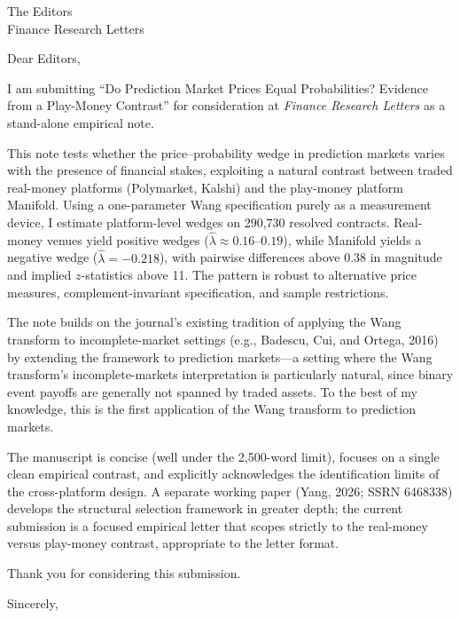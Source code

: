 \documentclass[11pt]{letter}
\begin{document}
\begin{letter}{The Editors\\Finance Research Letters}

\opening{Dear Editors,}

I am submitting ``Do Prediction Market Prices Equal Probabilities? Evidence from a Play-Money Contrast'' for consideration at \textit{Finance Research Letters} as a stand-alone empirical note.

This note tests whether the price--probability wedge in prediction markets varies with the presence of financial stakes, exploiting a natural contrast between traded real-money platforms (Polymarket, Kalshi) and the play-money platform Manifold. Using a one-parameter Wang specification purely as a measurement device, I estimate platform-level wedges on 290{,}730 resolved contracts. Real-money venues yield positive wedges ($\hat\lambda \approx 0.16$--$0.19$), while Manifold yields a negative wedge ($\hat\lambda = -0.218$), with pairwise differences above 0.38 in magnitude and implied $z$-statistics above 11. The pattern is robust to alternative price measures, complement-invariant specification, and sample restrictions.

The note builds on the journal's existing tradition of applying the Wang transform to incomplete-market settings (e.g., Badescu, Cui, and Ortega, 2016) by extending the framework to prediction markets---a setting where the Wang transform's incomplete-markets interpretation is particularly natural, since binary event payoffs are generally not spanned by traded assets. To the best of my knowledge, this is the first application of the Wang transform to prediction markets.

The manuscript is concise (well under the 2{,}500-word limit), focuses on a single clean empirical contrast, and explicitly acknowledges the identification limits of the cross-platform design. A separate working paper (Yang, 2026; SSRN 6468338) develops the structural selection framework in greater depth; the current submission is a focused empirical letter that scopes strictly to the real-money versus play-money contrast, appropriate to the letter format.

Thank you for considering this submission.

\closing{Sincerely,}

\end{letter}
\end{document}
